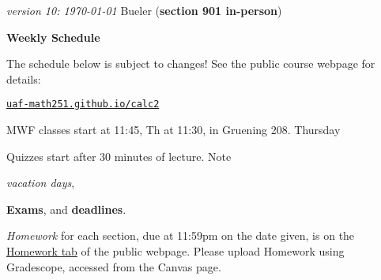 \documentclass[12pt]{article}
\newcommand{\vacinline}[1]{{\color{OliveGreen} \textsl{#1}}}
\newcommand{\vac}[1]{\strut {\small {\vacinline{#1}}}}
\newcommand{\due}[1]{\strut {\color{BrickRed} \textsl{#1}}}
\newcommand{\dl}[1]{{\small \color{Purple} \textbf{#1}}}
\newcommand{\ee}[1]{\strut {\color{Blue} \textbf{#1}}}
\newcommand{\qq}[1]{\strut {\color{RedOrange} #1}}
\begin{document}
\noindent\footnotesize \emph{version 10: \today} \normalsize \hfill Bueler (\textbf{section 901 in-person})

\bigskip
\centerline{\Large \textbf{Weekly Schedule}}

\bigskip
The schedule below is subject to changes!  See the public course webpage for details:

\medskip

\centerline{\href{https://uaf-math251.github.io/calc2/}{\texttt{uaf-math251.github.io/calc2}}}

\noindent MWF classes start at 11:45, Th at 11:30, in Gruening 208.  Thursday \qq{Quizzes} start after 30 minutes of lecture.  Note \vac{vacation days}, \ee{Exams}, and \dl{deadlines}.  \due{Homework} for each section, due at 11:59pm on the date given, is on the \href{https://uaf-math251.github.io/calc2/}{Homework tab} of the public webpage.  Please upload Homework using Gradescope, accessed from the Canvas page.

\bigskip
\end{document}
